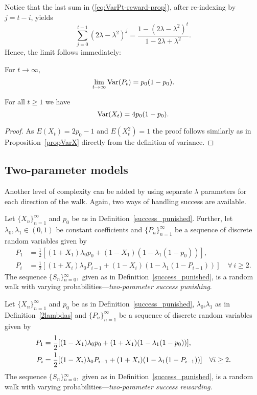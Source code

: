 Notice that the last sum in (\ref{eq:VarPt-reward-prop}), after re-indexing
by $j=t-i$, yields
\[
\sum_{j=0}^{t-1}(2\lambda-\lambda^{2})^{j}=\frac{1-(2\lambda-\lambda^{2})^{t}}{1-2\lambda+\lambda^{2}}.
\]
Hence, the limit follows immediately:

\begin{corollary}
For $t\rightarrow\infty,$
\[
\lim_{t\to\infty}\mathop{\rm Var}(P_{t})=p_{0}(1-p_{0}).
\]
\end{corollary}

\begin{proposition}
For all $t\geq1$ we have
\[
\mathop{\rm Var}(X_{t})=4p_0(1-p_0).
\]
\end{proposition}

\begin{proof}
As $E(X_t)=2p_0-1$ and $E(X_t^2)=1$ the proof follows similarly as in Proposition~\ref{propVarX} directly from the definition of variance.
\end{proof}

\subsection{Two-parameter models}\label{subsec:two-parameter-models}
Another level of complexity can be added by using separate $\lambda$
parameters for each direction of the walk.
Again, two ways of handling
success are available.

\begin{definition}
\label{2lambdas} Let ${\{X_{n}\}}_{n=1}^{\infty}$ and $p_{0}$ be
as in Definition~\ref{success_punished}.
Further, let $\lambda_{0},\lambda_{1}\in(0,1)$
be constant coefficients and ${\{P_{n}\}}_{n=1}^{\infty}$ be a sequence
of discrete random variables given by
\begin{eqnarray}
P_{1}&=\frac{1}{2}[(1+X_{1})\lambda_{0}p_{0}+(1-X_{1})(1-\lambda_{1}(1-p_{0}))],\label{eq:P!1_def-1-1}
\\
P_{i}&=\frac{1}{2}[(1+X_{i})\lambda_{0}P_{i-1}+(1-X_{i})(1-\lambda_{1}(1-P_{i-1}))]\quad \forall\, i\geq2.\label{eq:Pi_def-1-1}
\end{eqnarray}
The sequence ${\{S_{n}\}}{}_{n=0}^{\infty},$ given as in Definition~\ref{success_punished}, is a random walk with varying probabilities---\emph{two-parameter success
punishing}.
\end{definition}


\begin{definition}
\label{2lambdas-reward}Let ${\{X_{n}\}}_{n=1}^{\infty}$ and $p_{0}$
be as in Definition~\ref{success_punished}, $\lambda_{0}$,$\lambda_{1}$
as in Definition~\ref{2lambdas} and ${\{P_{n}\}}_{n=1}^{\infty}$ be a sequence
of discrete random variables given by
$$
\aligned
P_{1}&=\frac{1}{2}[(1-X_{1})\lambda_{0}p_{0}+(1+X_{1})(1-\lambda_{1}(1-p_{0}))],\\
P_{i}&=\frac{1}{2}[(1-X_{i})\lambda_{0}P_{i-1}+(1+X_{i})(1-\lambda_{1}(1-P_{i-1}))]\quad \forall\, i\geq2.
\endaligned
$$
The sequence ${\{S_{n}\}}{}_{n=0}^{\infty},$ given as in Definition~\ref{success_punished}, is a random walk with varying probabilities---\emph{two-parameter success
rewarding}.
\end{definition}


